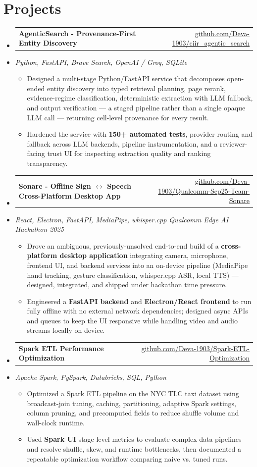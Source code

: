 \documentclass[letterpaper,10pt]{article}
\makeatletter
\newcommand{\resumeItem}[1]{
  \item\small{#1\vspace{-1pt}}
}
\newcommand{\resumeProjectHeading}[2]{
    \item
    \begin{tabular*}{0.985\textwidth}[t]{l@{\extracolsep{\fill}}r}
      \small\textbf{#1} & \small #2 \\
    \end{tabular*}\vspace{-5pt}
}
\newcommand{\resumeProjectSubheading}[1]{
  \vspace{-2pt}\item[] {\small\textcolor{ResumeSlate}{\emph{#1}}}\vspace{-3pt}
}
\newcommand{\resumeSubHeadingListStart}{\begin{itemize}[leftmargin=0.0in, label={}, itemsep=2pt, topsep=2pt]}
\newcommand{\resumeSubHeadingListEnd}{\end{itemize}}
\newcommand{\resumeItemListStart}{\begin{itemize}[leftmargin=0.18in, itemsep=2pt, topsep=1pt]}
\newcommand{\resumeItemListEnd}{\end{itemize}\vspace{-4pt}}
\makeatother
\begin{document}
\section{Projects}
\resumeSubHeadingListStart
  \resumeProjectHeading
    {AgenticSearch - Provenance-First Entity Discovery}
    {\href{https://github.com/Deva-1903/ciir_agentic_search}{github.com/Deva-1903/ciir\_agentic\_search}}
  \resumeProjectSubheading{Python, FastAPI, Brave Search, OpenAI / Groq, SQLite}
    \resumeItemListStart
      \resumeItem{Designed a multi-stage Python/FastAPI service that decomposes open-ended entity discovery into typed retrieval planning, page rerank, evidence-regime classification, deterministic extraction with LLM fallback, and output verification --- a staged pipeline rather than a single opaque LLM call --- returning cell-level provenance for every result.}
      \resumeItem{Hardened the service with \textbf{150+ automated tests}, provider routing and fallback across LLM backends, pipeline instrumentation, and a reviewer-facing trust UI for inspecting extraction quality and ranking transparency.}
    \resumeItemListEnd
  \resumeProjectHeading
    {Sonare - Offline Sign \(\leftrightarrow\) Speech Cross-Platform Desktop App}
    {\href{https://github.com/Deva-1903/Qualcomm-Sep25-Team-Sonare}{github.com/Deva-1903/Qualcomm-Sep25-Team-Sonare}}
  \resumeProjectSubheading{React, Electron, FastAPI, MediaPipe, whisper.cpp \enspace\textbar\enspace Qualcomm Edge AI Hackathon 2025}
    \resumeItemListStart
      \resumeItem{Drove an ambiguous, previously-unsolved end-to-end build of a \textbf{cross-platform desktop application} integrating camera, microphone, frontend UI, and backend services into an on-device pipeline (MediaPipe hand tracking, gesture classification, whisper.cpp ASR, local TTS) --- designed, integrated, and shipped under hackathon time pressure.}
      \resumeItem{Engineered a \textbf{FastAPI backend} and \textbf{Electron/React frontend} to run fully offline with no external network dependencies; designed async APIs and queues to keep the UI responsive while handling video and audio streams locally on device.}
    \resumeItemListEnd
  \resumeProjectHeading
    {Spark ETL Performance Optimization}
    {\href{https://github.com/Deva-1903/Spark-ETL-Optimization}{github.com/Deva-1903/Spark-ETL-Optimization}}
  \resumeProjectSubheading{Apache Spark, PySpark, Databricks, SQL, Python}
    \resumeItemListStart
      \resumeItem{Optimized a Spark ETL pipeline on the NYC TLC taxi dataset using broadcast-join tuning, caching, partitioning, adaptive Spark settings, column pruning, and precomputed fields to reduce shuffle volume and wall-clock runtime.}
      \resumeItem{Used \textbf{Spark UI} stage-level metrics to evaluate complex data pipelines and resolve shuffle, skew, and runtime bottlenecks, then documented a repeatable optimization workflow comparing naive vs. tuned runs.}
    \resumeItemListEnd
\resumeSubHeadingListEnd
\vspace{-4pt}
\end{document}
